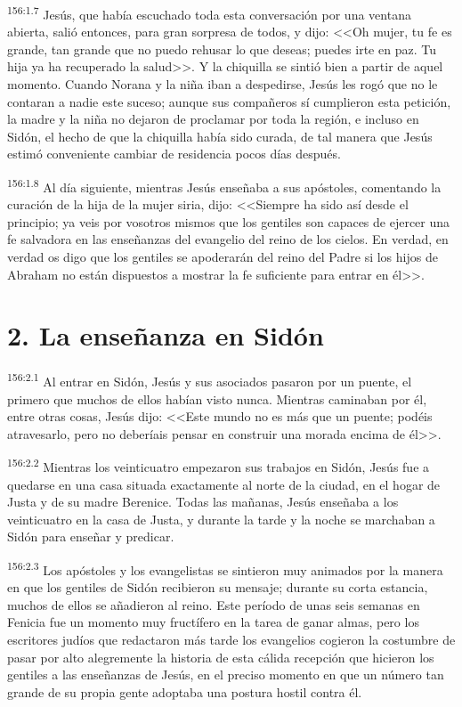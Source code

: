 \par 
\textsuperscript{156:1.7} Jesús, que había escuchado toda esta conversación por una ventana abierta, salió entonces, para gran sorpresa de todos, y dijo: <<Oh mujer, tu fe es grande, tan grande que no puedo rehusar lo que deseas; puedes irte en paz. Tu hija ya ha recuperado la salud>>. Y la chiquilla se sintió bien a partir de aquel momento. Cuando Norana y la niña iban a despedirse, Jesús les rogó que no le contaran a nadie este suceso; aunque sus compañeros sí cumplieron esta petición, la madre y la niña no dejaron de proclamar por toda la región, e incluso en Sidón, el hecho de que la chiquilla había sido curada, de tal manera que Jesús estimó conveniente cambiar de residencia pocos días después.

\par 
\textsuperscript{156:1.8} Al día siguiente, mientras Jesús enseñaba a sus apóstoles, comentando la curación de la hija de la mujer siria, dijo: <<Siempre ha sido así desde el principio; ya veis por vosotros mismos que los gentiles son capaces de ejercer una fe salvadora en las enseñanzas del evangelio del reino de los cielos. En verdad, en verdad os digo que los gentiles se apoderarán del reino del Padre si los hijos de Abraham no están dispuestos a mostrar la fe suficiente para entrar en él>>.

\section*{2. La enseñanza en Sidón}
\par 
\textsuperscript{156:2.1} Al entrar en Sidón, Jesús y sus asociados pasaron por un puente, el primero que muchos de ellos habían visto nunca. Mientras caminaban por él, entre otras cosas, Jesús dijo: <<Este mundo no es más que un puente; podéis atravesarlo, pero no deberíais pensar en construir una morada encima de él>>.

\par 
\textsuperscript{156:2.2} Mientras los veinticuatro empezaron sus trabajos en Sidón, Jesús fue a quedarse en una casa situada exactamente al norte de la ciudad, en el hogar de Justa y de su madre Berenice. Todas las mañanas, Jesús enseñaba a los veinticuatro en la casa de Justa, y durante la tarde y la noche se marchaban a Sidón para enseñar y predicar.

\par 
\textsuperscript{156:2.3} Los apóstoles y los evangelistas se sintieron muy animados por la manera en que los gentiles de Sidón recibieron su mensaje; durante su corta estancia, muchos de ellos se añadieron al reino. Este período de unas seis semanas en Fenicia fue un momento muy fructífero en la tarea de ganar almas, pero los escritores judíos que redactaron más tarde los evangelios cogieron la costumbre de pasar por alto alegremente la historia de esta cálida recepción que hicieron los gentiles a las enseñanzas de Jesús, en el preciso momento en que un número tan grande de su propia gente adoptaba una postura hostil contra él.

